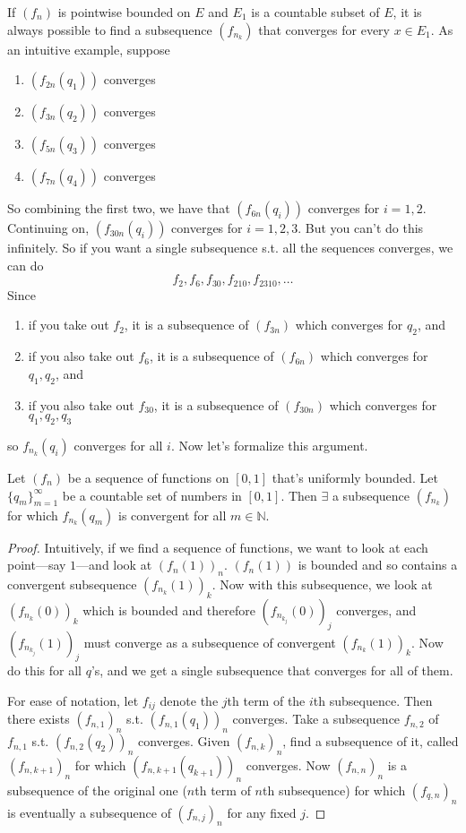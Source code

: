   If $(f_n)$ is pointwise bounded on $E$ and $E_1$ is a countable subset of $E$, it is always possible to find a subsequence $(f_{n_k})$ that converges for every $x \in E_1$. As an intuitive example, suppose 
  \begin{enumerate}
    \item $(f_{2n} (q_1))$ converges 
    \item $(f_{3n} (q_2))$ converges 
    \item $(f_{5n} (q_3))$ converges 
    \item $(f_{7n} (q_4))$ converges 
  \end{enumerate}
  So combining the first two, we have that $(f_{6n}(q_i))$ converges for $i = 1, 2$. Continuing on, $(f_{30n} (q_i))$ converges for $i = 1, 2, 3$. But you can't do this infinitely. So if you want a single subsequence s.t. all the sequences converges, we can do 
  \begin{equation}
    f_2, f_6, f_{30}, f_{210}, f_{2310}, \ldots
  \end{equation}
  Since 
  \begin{enumerate}
    \item if you take out $f_2$, it is a subsequence of $(f_{3n})$ which converges for $q_2$, and 
    \item if you also take out $f_{6}$, it is a subsequence of $(f_{6n})$ which converges for $q_1, q_2$, and 
    \item if you also take out $f_{30}$, it is a subsequence of $(f_{30n})$ which converges for $q_1, q_2, q_3$
  \end{enumerate}
  so $f_{n_k} (q_i)$ converges for all $i$. Now let's formalize this argument. 

  \begin{lemma} 
    Let $(f_n)$ be a sequence of functions on $[0, 1]$ that's uniformly bounded. Let $\{q_m\}_{m=1}^\infty$ be a countable set of numbers in $[0, 1]$. Then $\exists$ a subsequence $(f_{n_k})$ for which $f_{n_k} (q_m)$ is convergent for all $m \in \mathbb{N}$. 
  \end{lemma}
  \begin{proof}
    Intuitively, if we find a sequence of functions, we want to look at each point---say $1$---and look at $(f_n (1))_n$. $(f_n (1))$ is bounded and so contains a convergent subsequence $(f_{n_k} (1))_k$. Now with this subsequence, we look at $(f_{n_k} (0))_k$ which is bounded and therefore $(f_{n_{k_j}}(0))_j$ converges, and $(f_{n_{k_{j}}}(1))_j$ must converge as a subsequence of convergent $(f_{n_k} (1))_k$. Now do this for all $q$'s, and we get a single subsequence that converges for all of them. 

    For ease of notation, let $f_{ij}$ denote the $j$th term of the $i$th subsequence. Then there exists $(f_{n, 1})_n$ s.t. $(f_{n, 1} (q_1))_n$ converges. Take a subsequence $f_{n, 2}$ of $f_{n, 1}$ s.t. $(f_{n, 2} (q_2))_n$ converges. Given $(f_{n, k})_n$, find a subsequence of it, called $(f_{n, k+1})_n$ for which $(f_{n, k+1} (q_{k+1}))_n$ converges. Now $(f_{n, n})_n$ is a subsequence of the original one ($n$th term of $n$th subsequence) for which $(f_{q, n})_n$ is eventually a subsequence of $(f_{n, j})_n$ for any fixed $j$. 
  \end{proof} 

